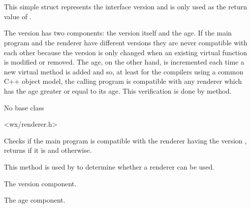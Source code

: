 
\section{}\label{wxrendererversion}

This simple struct represents the  
interface version and is only used as the return value of 
.

The version has two components: the version itself and the age. If the main
program and the renderer have different versions they are never compatible with
each other because the version is only changed when an existing virtual
function is modified or removed. The age, on the other hand, is incremented
each time a new virtual method is added and so, at least for the compilers
using a common C++ object model, the calling program is compatible with any
renderer which has the age greater or equal to its age. This verification is
done by  method.



No base class


<wx/renderer.h>



\label{wxrenderernativeiscompatible}


Checks if the main program is compatible with the renderer having the version 
, returns \true if it is and \false otherwise.

This method is used by 
 to determine whether a
renderer can be used.




The version component.




The age component.


